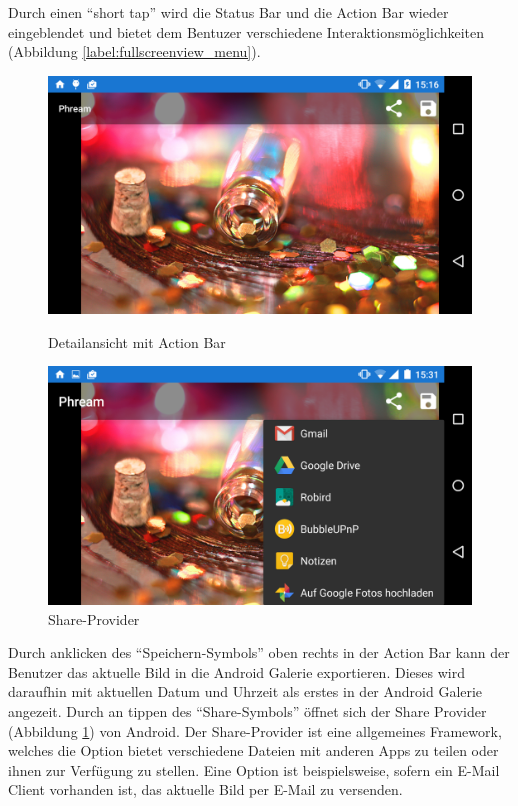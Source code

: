 Durch einen \enquote{short tap} wird die Status Bar und die Action Bar wieder eingeblendet und bietet dem Bentuzer verschiedene Interaktionsmöglichkeiten (Abbildung \ref{label:fullscreenview_menu}).

\begin{figure}[H]
\centering
	\begin{minipage}{0.4\textwidth} 
	\centering
	\includegraphics[width=1\textwidth]{images/screenshots/fullscreenview_menu.png}
	\caption{Detailansicht mit Action Bar}
	\label{label:fullscreenview_menu}
	\end{minipage}
	\hfill
	\begin{minipage}{0.4\textwidth}
	\centering
	\includegraphics[width=1\textwidth]{images/screenshots/fullscreenview_share.png}
	\caption{Share-Provider}
	\label{label:fullscreenview_share}
	\end{minipage}
\end{figure}

Durch anklicken des \enquote{Speichern-Symbols} oben rechts in der Action Bar kann der Benutzer das aktuelle Bild in die Android Galerie exportieren. Dieses wird daraufhin mit aktuellen Datum und Uhrzeit als erstes in der Android Galerie angezeit. Durch an tippen des \enquote{Share-Symbols} öffnet sich der Share Provider (Abbildung \ref{label:fullscreenview_share}) von Android. Der Share-Provider ist eine allgemeines Framework, welches die Option bietet verschiedene Dateien mit anderen Apps zu teilen oder ihnen zur Verfügung zu stellen. Eine Option ist beispielsweise, sofern ein E-Mail Client vorhanden ist, das aktuelle Bild per E-Mail zu versenden.

